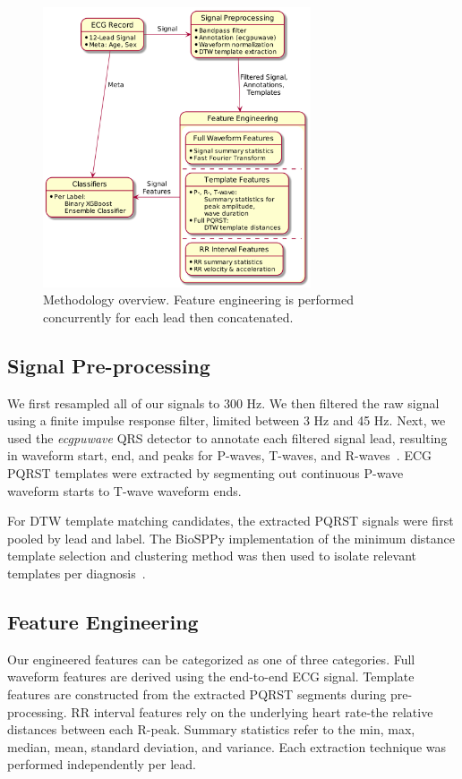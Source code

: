 \documentclass[twocolumn]{cinc}
\begin{document}
\begin{figure}[h]
  \centering
  \includegraphics[width=7.9cm]{fig/methodology.png}
  \caption{Methodology overview. Feature engineering is performed concurrently for each lead then concatenated.}
  \label{fig:methodology}
\end{figure}

\subsection{Signal Pre-processing}

We first resampled all of our signals to 300 Hz.
We then filtered the raw signal using a finite impulse response filter, limited between 3 Hz and 45 Hz.
Next, we used the \emph{ecgpuwave} QRS detector to annotate each filtered signal lead, resulting in waveform start, end, and peaks for P-waves, T-waves, and R-waves~\cite{goldberger_ary_l_physiobank_2000}.
ECG PQRST templates were extracted by segmenting out continuous P-wave waveform starts to T-wave waveform ends.

For DTW template matching candidates, the extracted PQRST signals were first pooled by lead and label.
The BioSPPy implementation of the minimum distance template selection and clustering method was then used to isolate relevant templates per diagnosis~\cite{groupbiosppy_2015, uludag_biometric_2004}.

\subsection{Feature Engineering}

Our engineered features can be categorized as one of three categories.
Full waveform features are derived using the end-to-end ECG signal.
Template features are constructed from the extracted PQRST segments during pre-processing.
RR interval features rely on the underlying heart rate-the relative distances between each R-peak.
Summary statistics refer to the min, max, median, mean, standard deviation, and variance.
Each extraction technique was performed independently per lead.
\end{document}
